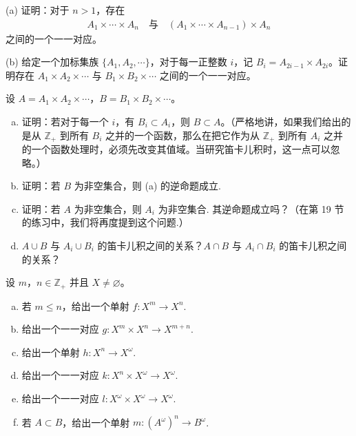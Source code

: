 \documentclass[../../main.tex]{subfiles}
\begin{document}
\begin{exercise}\label{exercise:ch01-笛卡儿积-2}
(a) 证明：对于 $n > 1$，存在
\begin{align*}
A_{1} \times \cdots \times A_{n} \quad \text{与} \quad (A_{1} \times \cdots \times A_{n-1}) \times A_{n}
\end{align*}
之间的一个一一对应。

(b) 给定一个加标集族 $\{A_{1}, A_{2}, \cdots\}$，对于每一正整数 $i$，记 $B_{i} = A_{2i-1} \times A_{2i}$。证明存在 $A_{1} \times A_{2} \times \cdots$ 与 $B_{1} \times B_{2} \times \cdots$ 之间的一个一一对应。
\end{exercise}

\begin{exercise}\label{exercise:ch01-笛卡儿积-3}
设 $A = A_{1} \times A_{2} \times \cdots$，$B = B_{1} \times B_{2} \times \cdots$。
\begin{enumerate}[(a)]
\item 证明：若对于每一个 $i$，有 $B_{i} \subset A_{i}$，则 $B \subset A$。（严格地讲，如果我们给出的是从 $\mathbb{Z}_{+}$ 到所有 $B_{i}$ 之并的一个函数，那么在把它作为从 $\mathbb{Z}_{+}$ 到所有 $A_{i}$ 之并的一个函数处理时，必须先改变其值域。当研究笛卡儿积时，这一点可以忽略。）
\item 证明：若 $B$ 为非空集合，则 (a) 的逆命题成立.
\item 证明：若 $A$ 为非空集合，则 $A_{i}$ 为非空集合. 其逆命题成立吗？（在第 19 节的练习中，我们将再度提到这个问题.）
\item $A \cup B$ 与 $A_{i} \cup B_{i}$ 的笛卡儿积之间的关系？$A \cap B$ 与 $A_{i} \cap B_{i}$ 的笛卡儿积之间的关系？
\end{enumerate}
\end{exercise}

\begin{exercise}\label{exercise:ch01-笛卡儿积-4}
设 $m$，$n \in \mathbb{Z}_{+}$ 并且 $X \neq \varnothing$。
\begin{enumerate}[(a)]
\item 若 $m \leqslant n$，给出一个单射 $f: X^{m} \longrightarrow X^{n}$.
\item 给出一个一一对应 $g: X^{m} \times X^{n} \longrightarrow X^{m+n}$.
\item 给出一个单射 $h: X^{n} \longrightarrow X^{\omega}$.
\item 给出一个一一对应 $k: X^{n} \times X^{\omega} \longrightarrow X^{\omega}$.
\item 给出一个一一对应 $l: X^{\omega} \times X^{\omega} \longrightarrow X^{\omega}$.
\item 若 $A \subset B$，给出一个单射 $m: (A^{\omega})^{n} \longrightarrow B^{\omega}$.
\end{enumerate}
\end{exercise}
\end{document}
